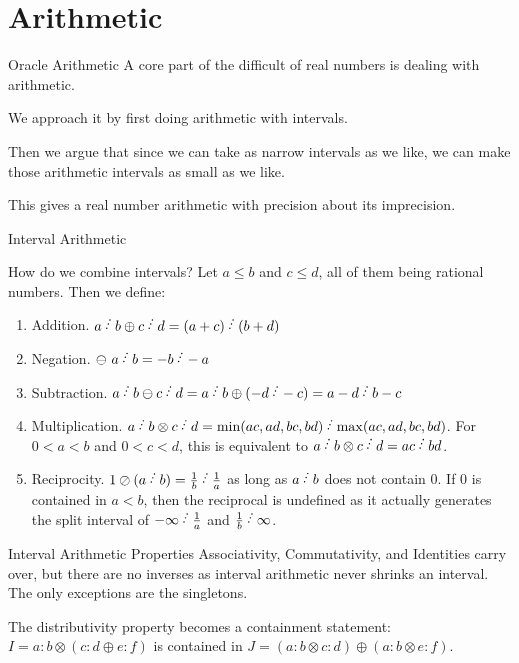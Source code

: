 \documentclass{beamer}
\begin{document}
\section{Arithmetic}

\begin{frame}{Oracle Arithmetic}
    A core part of the difficult of real numbers is dealing with arithmetic. 

    We approach it by first doing arithmetic with intervals. 

    Then we argue that since we can take as narrow intervals as we like, we can make those arithmetic intervals as small as we like. 

    This gives a real number arithmetic with precision about its imprecision. 
\end{frame}

\begin{frame}{Interval Arithmetic}

    How do we combine intervals?  
    Let $a \leq b$ and $c \leq d$, all of them being rational numbers. Then we define:
\begin{enumerate}
    \item Addition. $a\lte b \oplus c\lte d = (a+c)\lte (b+d)$
    \item Negation. $\ominus\ a\lte b = -b\lte -a$
    \item Subtraction. $a\lte b \ominus c\lte d = a\lte b \oplus (-d\lte -c) = a-d\lte b-c$
    \item Multiplication. $a\lte b \otimes c\lte d = \min(ac, ad, bc, bd)\lte  \max(ac,ad,bc,bd)$. For $0<a<b$ and $0<c<d$, this is equivalent to $a\lte b \otimes c\lte d = ac\lte bd$. 
    \item Reciprocity. $1 \oslash (a\lte b) = \frac{1}{b}\lte \frac{1}{a}$ as long as $a\lte b$ does not contain 0. If 0 is contained in $a \lt b$, then the reciprocal is undefined as it actually generates the split interval of $-\infty\lte \frac{1}{a}$ and $\frac{1}{b}\lte \infty$.
\end{enumerate}



\end{frame}

\begin{frame}{Interval Arithmetic Properties}
    Associativity, Commutativity, and Identities carry over, but there are no inverses as interval arithmetic never shrinks an interval. The only exceptions are the singletons. 
    
    The distributivity property becomes a containment statement:   $I = a:b\otimes(c:d \oplus e:f)$ is contained in $J = (a:b \otimes c:d) \oplus (a:b \otimes e:f)$. 
    
\end{frame}
\end{document}
